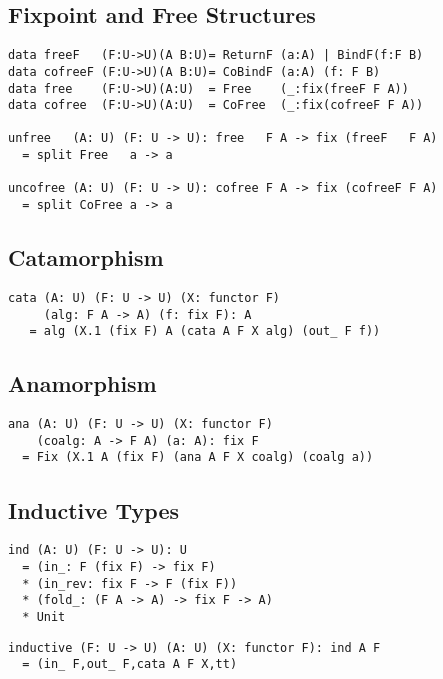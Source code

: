 \documentclass{article}
\begin{document}
\subsection{Fixpoint and Free Structures}

\begin{lstlisting}[mathescape=true]
data freeF   (F:U->U)(A B:U)= ReturnF (a:A) | BindF(f:F B)
data cofreeF (F:U->U)(A B:U)= CoBindF (a:A) (f: F B)
data free    (F:U->U)(A:U)  = Free    (_:fix(freeF F A))
data cofree  (F:U->U)(A:U)  = CoFree  (_:fix(cofreeF F A))

unfree   (A: U) (F: U -> U): free   F A -> fix (freeF   F A)
  = split Free   a -> a

uncofree (A: U) (F: U -> U): cofree F A -> fix (cofreeF F A)
  = split CoFree a -> a
\end{lstlisting}

\subsection{Catamorphism}

\begin{lstlisting}[mathescape=true]
cata (A: U) (F: U -> U) (X: functor F)
     (alg: F A -> A) (f: fix F): A
   = alg (X.1 (fix F) A (cata A F X alg) (out_ F f))
\end{lstlisting}

\subsection{Anamorphism}

\begin{lstlisting}[mathescape=true]
ana (A: U) (F: U -> U) (X: functor F)
    (coalg: A -> F A) (a: A): fix F
  = Fix (X.1 A (fix F) (ana A F X coalg) (coalg a))
\end{lstlisting}

\subsection{Inductive Types}

\begin{lstlisting}[mathescape=true]
ind (A: U) (F: U -> U): U
  = (in_: F (fix F) -> fix F)
  * (in_rev: fix F -> F (fix F))
  * (fold_: (F A -> A) -> fix F -> A)
  * Unit
\end{lstlisting}

\begin{lstlisting}[mathescape=true]
inductive (F: U -> U) (A: U) (X: functor F): ind A F
  = (in_ F,out_ F,cata A F X,tt)
\end{lstlisting}
\end{document}
